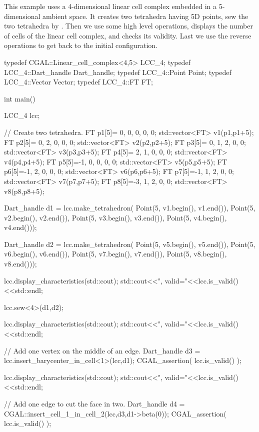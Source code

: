 This example uses a 4-dimensional linear cell complex embedded in a
5-dimensional ambient space.  It creates two tetrahedra having 5D
points, sew the two tetrahedra by \betaquatre{}. Then we use some high
level operations, displays the number of cells of the linear cell
complex, and checks its validity.  Last we use the reverse operations
to get back to the initial configuration.

\begin{ccExampleCode}
typedef CGAL::Linear_cell_complex<4,5> LCC_4;
typedef LCC_4::Dart_handle Dart_handle;
typedef LCC_4::Point Point;
typedef LCC_4::Vector Vector;
typedef LCC_4::FT FT;

int main()
{
  LCC_4 lcc;
	
  // Create two tetrahedra.
  FT p1[5]={ 0, 0, 0, 0, 0}; std::vector<FT> v1(p1,p1+5);
  FT p2[5]={ 0, 2, 0, 0, 0}; std::vector<FT> v2(p2,p2+5);
  FT p3[5]={ 0, 1, 2, 0, 0}; std::vector<FT> v3(p3,p3+5);
  FT p4[5]={ 2, 1, 0, 0, 0}; std::vector<FT> v4(p4,p4+5);
  FT p5[5]={-1, 0, 0, 0, 0}; std::vector<FT> v5(p5,p5+5);
  FT p6[5]={-1, 2, 0, 0, 0}; std::vector<FT> v6(p6,p6+5);
  FT p7[5]={-1, 1, 2, 0, 0}; std::vector<FT> v7(p7,p7+5);
  FT p8[5]={-3, 1, 2, 0, 0}; std::vector<FT> v8(p8,p8+5);
  
  Dart_handle d1 = lcc.make_tetrahedron(
                      Point(5, v1.begin(), v1.end()),
                      Point(5, v2.begin(), v2.end()),
                      Point(5, v3.begin(), v3.end()),
                      Point(5, v4.begin(), v4.end()));  
  
  Dart_handle d2 = lcc.make_tetrahedron(
                      Point(5, v5.begin(), v5.end()),
                      Point(5, v6.begin(), v6.end()),
                      Point(5, v7.begin(), v7.end()),
                      Point(5, v8.begin(), v8.end()));

  lcc.display_characteristics(std::cout);
  std::cout<<", valid="<<lcc.is_valid()<<std::endl;

  lcc.sew<4>(d1,d2);
  
  lcc.display_characteristics(std::cout);
  std::cout<<", valid="<<lcc.is_valid()<<std::endl;

  // Add one vertex on the middle of an edge.
  Dart_handle d3 = lcc.insert_barycenter_in_cell<1>(lcc,d1);
  CGAL_assertion( lcc.is_valid() );

  lcc.display_characteristics(std::cout);
  std::cout<<", valid="<<lcc.is_valid()<<std::endl;

  // Add one edge to cut the face in two.
  Dart_handle d4 = CGAL::insert_cell_1_in_cell_2(lcc,d3,d1->beta(0));
  CGAL_assertion( lcc.is_valid() );
	
}
\end{ccExampleCode}

